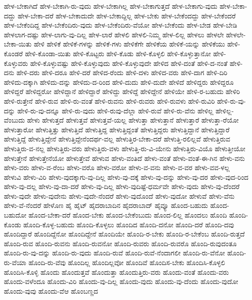 {ಹೇಳ-ಬೇಕಾಗಿದೆ
ಹೇಳ-ಬೇಕಾಗಿ-ರು-ವುದು
ಹೇಳ-ಬೇಕಾಗಿಲ್ಲ
ಹೇಳ-ಬೇಕಾಗುತ್ತದೆ
ಹೇಳ-ಬೇಕಾಗು-ವುದು
ಹೇಳ-ಬೇಕಾ-ದದ್ದು
ಹೇಳ-ಬೇಕಾ-ದರೆ
ಹೇಳ-ಬೇಕಾದುದೇ
ಹೇಳ-ಬೇಕಾದ್ದಿಲ್ಲ
ಹೇಳ-ಬೇಕು
ಹೇಳ-ಬೇಕೆಂದದ್ದು
ಹೇಳ-ಬೇಕೆಂದರೆ
ಹೇಳ-ಬೇಕೆಂದಿದ್ದ
ಹೇಳ-ಬೇಕೆಂದಿರು-ವುದು
ಹೇಳ-ಬೇಕೆಂದಿರು-ವೆಯೋ
ಹೇಳ-ಬೇಕೆಂದು
ಹೇಳ-ಬೇಡ
ಹೇಳ-ಬೇಡಿ
ಹೇಳಲಾಗ-ದಷ್ಟು
ಹೇಳ-ಲಾಗು-ವು-ದಿಲ್ಲ
ಹೇಳ-ಲಾರೆ
ಹೇಳಲಿ
ಹೇಳಲಿ-ನಿಮ್ಮ
ಹೇಳ-ಲಿಲ್ಲ
ಹೇಳಲು
ಹೇಳಲೇ
ಹೇಳಲೇ-ಬೇಕಾ-ಯಿತು
ಹೇಳಿ
ಹೇಳಿಕೆ
ಹೇಳಿಕೆ-ಗಳನ್ನು
ಹೇಳಿಕೆ-ಗಳು
ಹೇಳಿಕೆಗೇ
ಹೇಳಿಕೆಯ
ಹೇಳಿಕೆ-ಯನ್ನು
ಹೇಳಿಕೆಯು
ಹೇಳಿ-ಕೊಂಡರೆ
ಹೇಳಿ-ಕೊಂಡಾ-ಯಿತು
ಹೇಳಿ-ಕೊಟ್ಟರು
ಹೇಳಿ-ಕೊಡು
ಹೇಳಿ-ಕೊಳ್ಳಲಿ
ಹೇಳಿ-ಕೊಳ್ಳುತ್ತಾನೋ
ಹೇಳಿ-ಕೊಳ್ಳುವರು
ಹೇಳಿ-ಕೊಳ್ಳುವಷ್ಟು
ಹೇಳಿ-ಕೊಳ್ಳುವುದು
ಹೇಳಿ-ಕೊಳ್ಳುವುದೇ
ಹೇಳಿದ
ಹೇಳಿ-ದಂತೆ
ಹೇಳಿ-ದ-ನಂತೆ
ಹೇಳಿ-ದನು
ಹೇಳಿ-ದರು
ಹೇಳಿ-ದರೂ
ಹೇಳಿ-ದರೆ
ಹೇಳಿದ-ರೆಂದು
ಹೇಳಿ-ದಳು
ಹೇಳಿದ-ವರು
ಹೇಳಿ-ದಾಗ
ಹೇಳಿ-ದಿರಿ
ಹೇಳಿದು-ದಕ್ಕಾಗಿ
ಹೇಳಿದು-ದನ್ನು
ಹೇಳಿದು-ದ-ರಿಂದ
ಹೇಳಿ-ದುದು
ಹೇಳಿ-ದುದೇ
ಹೇಳಿದೆ
ಹೇಳಿದ್ದರು
ಹೇಳಿದ್ದರೂ
ಹೇಳಿದ್ದರೆ
ಹೇಳಿದ್ದರೋ
ಹೇಳಿದ್ದಾನೆ
ಹೇಳಿದ್ದಾರೆ
ಹೇಳಿದ್ದು
ಹೇಳಿದ್ದೆ
ಹೇಳಿದ್ದೇನೆ
ಹೇಳಿಯೇ
ಹೇಳಿ-ರ-ಬಹುದು
ಹೇಳಿರಿ
ಹೇಳಿ-ರುತ್ತೇನೆ
ಹೇಳಿ-ರುವ
ಹೇಳಿ-ರು-ವಂತೆ
ಹೇಳಿ-ರುವನು
ಹೇಳಿ-ರುವರು
ಹೇಳಿ-ರುವಳು
ಹೇಳಿ-ರುವಿರಿ
ಹೇಳಿ-ರು-ವು-ದನ್ನು
ಹೇಳಿ-ರು-ವು-ದನ್ನೂ
ಹೇಳಿ-ರು-ವುದು
ಹೇಳಿ-ರುವು-ದೆಲ್ಲಾ
ಹೇಳಿ-ರುವೆ
ಹೇಳಿ-ರು-ವೆನು
ಹೇಳಿಲ್ಲ
ಹೇಳಿಲ್ಲ-ವೆಂಬುದು
ಹೇಳು
ಹೇಳುತ್ತದೆ
ಹೇಳುತ್ತವೆ
ಹೇಳುತ್ತವೆ-ಯಲ್ಲ
ಹೇಳುತ್ತಾ
ಹೇಳುತ್ತಾನೆ
ಹೇಳುತ್ತಾರೆ
ಹೇಳುತ್ತಾ-ರೆಯೋ
ಹೇಳುತ್ತಾರೋ
ಹೇಳುತ್ತಿತ್ತು
ಹೇಳುತ್ತಿದೆ
ಹೇಳುತ್ತಿದ್ದ
ಹೇಳುತ್ತಿದ್ದಂತೆ
ಹೇಳುತ್ತಿದ್ದರು
ಹೇಳುತ್ತಿದ್ದಾನೆ
ಹೇಳುತ್ತಿದ್ದಾರೆ
ಹೇಳುತ್ತಿದ್ದೆ
ಹೇಳುತ್ತಿದ್ದೇನೆ
ಹೇಳುತ್ತಿದ್ದೇನೆಂದರ್ಥ-ವಲ್ಲ
ಹೇಳುತ್ತಿರ-ಬೇಕಾ-ದರೆ
ಹೇಳುತ್ತಿ-ರಲಿಲ್ಲವೆ
ಹೇಳುತ್ತಿರುವ
ಹೇಳುತ್ತಿರು-ವ-ನಲ್ಲ
ಹೇಳುತ್ತಿರು-ವರು
ಹೇಳುತ್ತಿರು-ವಳು
ಹೇಳುತ್ತಿ-ರು-ವಿ-ಯೇನು
ಹೇಳುತ್ತಿರು-ವಿಯೊ
ಹೇಳುತ್ತೀಯೋ
ಹೇಳುತ್ತೇನೆ
ಹೇಳುತ್ತೇನೆಯೋ
ಹೇಳುತ್ತೇವೆ
ಹೇಳುವ
ಹೇಳು-ವಂತಿದೆ
ಹೇಳು-ವಂತೆ
ಹೇಳು-ವಂತೆ-ಈ-ಗಿನ
ಹೇಳು-ವನು
ಹೇಳು-ವರು
ಹೇಳು-ವ-ರೆಂಬ
ಹೇಳು-ವರೊ
ಹೇಳು-ವರೋ
ಹೇಳು-ವ-ವನು
ಹೇಳು-ವ-ವರ
ಹೇಳು-ವವ-ಳಲ್ಲ
ಹೇಳುವಿ
ಹೇಳು-ವಿರಿ
ಹೇಳು-ವುದಕ್ಕಾಗು-ವು-ದಿಲ್ಲ
ಹೇಳು-ವು-ದಕ್ಕೆ
ಹೇಳು-ವು-ದನ್ನು
ಹೇಳು-ವು-ದರ
ಹೇಳು-ವುದ-ರಿಂದ
ಹೇಳು-ವು-ದಲ್ಲ
ಹೇಳು-ವು-ದಾ-ದರೆ
ಹೇಳು-ವು-ದಿಲ್ಲ
ಹೇಳು-ವುದಿಷ್ಟೆ-ಧರ್ಮವೇ
ಹೇಳು-ವುದು
ಹೇಳು-ವು-ದೆಂದರೆ
ಹೇಳು-ವುದೇ
ಹೇಳು-ವುದೇನು
ಹೇಳು-ವುದೇ-ನೆಂದರೆ
ಹೇಳು-ವುದೊಂದೆ
ಹೇಳು-ವುದೋ
ಹೇಳುವೆ
ಹೇಳು-ವೆನು
ಹೇಳು-ವೆ-ನೆಂದರೆ
ಹೇಳೊಣ
ಹೈ
ಹೈಟ್
ಹೈದರಾಬಾದಿನ
ಹೈದರಾಬಾದ್
ಹೈವ್ಯೂ
ಹೊಂದ-ಬಹುದು
ಹೊಂದ-ಬಹುದೋ
ಹೊಂದ-ಬೇಕಾ-ದರೆ
ಹೊಂದ-ಬೇಕು
ಹೊಂದ-ಬೇಕೆಂಬುದು
ಹೊಂದ-ಲಿಲ್ಲ
ಹೊಂದಲು
ಹೊಂದಿ
ಹೊಂದಿ-ಕೊಂಡು
ಹೊಂದಿ-ಕೊಳ್ಳ-ಬಹುದು
ಹೊಂದಿ-ಕೊಳ್ಳಲು
ಹೊಂದಿದ
ಹೊಂದಿ-ದನೋ
ಹೊಂದಿ-ದರೆ
ಹೊಂದಿ-ದವು
ಹೊಂದಿದ್ದಾರೆ
ಹೊಂದಿದ್ದೆನೋ
ಹೊಂದಿದ್ದೇನೆ
ಹೊಂದಿಯೇ
ಹೊಂದಿ-ರ-ಬೇಕು
ಹೊಂದಿ-ರ-ಬೇಕೆಂಬ
ಹೊಂದಿ-ರುತ್ತದೆ
ಹೊಂದಿ-ರುವ
ಹೊಂದಿ-ರುವನು
ಹೊಂದಿ-ರುವನೋ
ಹೊಂದಿ-ರುವರು
ಹೊಂದಿ-ರುವರೊ
ಹೊಂದಿ-ರುವುದಂತೂ
ಹೊಂದಿ-ರು-ವು-ದನ್ನು
ಹೊಂದಿ-ರು-ವುದು
ಹೊಂದಿ-ರುವೆ
ಹೊಂದಿ-ರುವೆ-ನೆಂದಾಗಲೀ
ಹೊಂದಿ-ರು-ವೆನೋ
ಹೊಂದಿ-ರು-ವೆಯಾ
ಹೊಂದಿ-ರು-ವೆವು
ಹೊಂದಿಲ್ಲ
ಹೊಂದಿಲ್ಲವೋ
ಹೊಂದಿವೆ
ಹೊಂದಿಸ-ಬೇಕು
ಹೊಂದಿಸಿ-ಕೊಳ್ಳಲಿ
ಹೊಂದಿಸಿ-ಕೊಳ್ಳಿ
ಹೊಂದು
ಹೊಂದುತ್ತವೆ
ಹೊಂದುತ್ತಾ
ಹೊಂದುತ್ತಿರು-ವರು
ಹೊಂದು-ವಂತೆ
ಹೊಂದು-ವರು
ಹೊಂದು-ವಳೆಂದೂ
ಹೊಂದು-ವಿರಿ
ಹೊಂದು-ವು-ದಿಲ್ಲ
ಹೊಂದು-ವುದು
ಹೊಂದು-ವು-ದೆಂದು
ಹೊಂದು-ವುದೋ
ಹೊಂದು-ವುವು
ಹೊಂದು-ವೆಆ
ಹೊಂಬಣ್ಣದ
}
